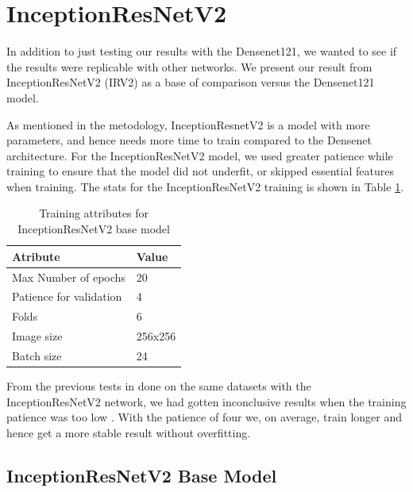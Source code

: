 \FloatBarrier
\clearpage
\section{InceptionResNetV2}
In addition to just testing our results with the Densenet121, we wanted to see if the results were replicable with other networks. We present our result from InceptionResNetV2 (IRV2) as a base of comparison versus the Densenet121 model. 


As mentioned in the metodology, InceptionResnetV2 is a model with more parameters, and hence needs more time to train compared to the Densenet architecture. 
For the InceptionResNetV2 model, we used greater patience while training to ensure that the model did not underfit, or skipped essential features when training.
The stats for the InceptionResNetV2 training is shown in Table \ref{tab:TrainingAttrIRV2}.



\begin{table}[h]
\begin{center}
\begin{tabular}{ll}
\toprule
Atribute                & Value   \\
\midrule
Max Number of epochs    & 20      \\
Patience for validation & 4       \\
Folds                   & 6       \\
Image size              & 256x256 \\
Batch size              & 24      \\   
\bottomrule
\end{tabular}
\end{center}
\caption{Training attributes for InceptionResNetV2 base model }
\label{tab:TrainingAttrIRV2}
\end{table}

From the previous tests in done on the same datasets with the InceptionResNetV2 network, we had gotten inconclusive results when the training patience was too low \cite{Mathias2019IEEpaper}. With the patience of four we, on average, train longer and hence get a more stable result without overfitting.

\FloatBarrier
\subsection{InceptionResNetV2 Base Model}


